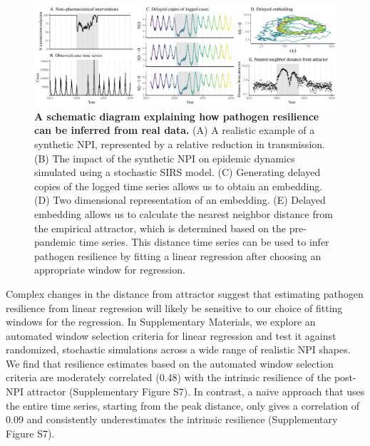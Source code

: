 \documentclass[12pt]{article}
\begin{document}
\begin{figure}[!ht]
\includegraphics[width=\textwidth]{../figure3/figure3.pdf}
\caption{
\textbf{A schematic diagram explaining how pathogen resilience can be inferred from real data.}
(A) A realistic example of a synthetic NPI, represented by a relative reduction in transmission.
(B) The impact of the synthetic NPI on epidemic dynamics simulated using a stochastic SIRS model.
(C) Generating delayed copies of the logged time series allows us to obtain an embedding.
(D) Two dimensional representation of an embedding.
(E) Delayed embedding allows us to calculate the nearest neighbor distance from the empirical attractor, which is determined based on the pre-pandemic time series.
This distance time series can be used to infer pathogen resilience by fitting a linear regression after choosing an appropriate window for regression.
}
\end{figure}

Complex changes in the distance from attractor suggest that estimating pathogen resilience from linear regression will likely be sensitive to our choice of fitting windows for the regression.
In Supplementary Materials, we explore an automated window selection criteria for linear regression and test it against randomized, stochastic simulations across a wide range of realistic NPI shapes.
We find that resilience estimates based on the automated window selection criteria are moderately correlated (0.48) with the intrinsic resilience of the post-NPI attractor (Supplementary Figure S7).
In contrast, a naive approach that uses the entire time series, starting from the peak distance, only gives a correlation of 0.09 and consistently underestimates the intrinsic resilience (Supplementary Figure S7).

\end{document}
